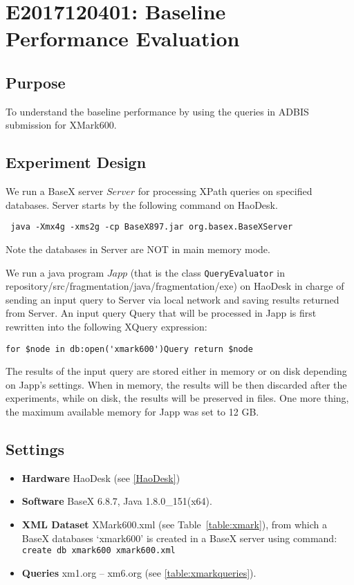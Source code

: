 \section{E2017120401: Baseline Performance Evaluation}
 
\subsection{Purpose}
To understand the baseline performance by using
the queries in ADBIS submission for XMark600. 

\subsection{Experiment Design}  

We run a BaseX server $Server$ for processing XPath queries on specified 
databases. Server starts by the following command on HaoDesk.

\verb| java -Xmx4g -xms2g -cp BaseX897.jar org.basex.BaseXServer|

Note the databases in Server are NOT in main memory mode.

We run a java program $Japp$ (that is the class \texttt{QueryEvaluator} 
in repository/src/fragmentation/java/fragmentation/exe)
on HaoDesk in charge of sending an input query to
Server via local network and saving results returned from Server. An input query 
Query that will be processed in Japp is first rewritten into the following XQuery expression:

\verb|for $node in db:open('xmark600')Query return $node|

The results of the input query are stored either in memory or on disk depending on Japp's settings. When in memory, the results will be then discarded after the
experiments, while on disk, the results will be preserved in files. One more thing, the maximum available memory for Japp was set to 12 GB.

\subsection{Settings} 

\begin{itemize}
	
	\item \textbf{Hardware} HaoDesk (see \ref{HaoDesk})\\
	\item \textbf{Software} BaseX 6.8.7, Java 1.8.0\_151(x64).\\
	\item \textbf{XML Dataset} XMark600.xml (see Table~\ref{table:xmark}), 
	from which a BaseX databases `xmark600' is created in a BaseX server using command:\\
	\verb|create db xmark600 xmark600.xml|
	\item \textbf{Queries} xm1.org -- xm6.org (see \ref{table:xmarkqueries}).
	
\end{itemize}


